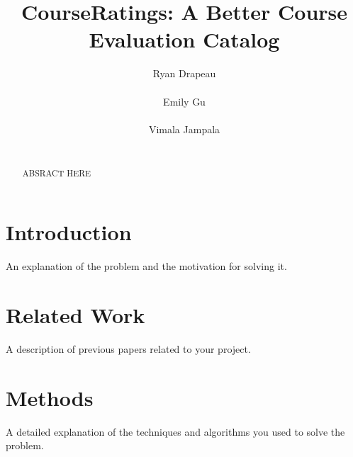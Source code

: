 \documentclass{chi2009}
\begin{document}
\setlength{\paperheight}{11in}
\setlength{\paperwidth}{8.5in}
\setlength{\pdfpageheight}{\paperheight}
\setlength{\pdfpagewidth}{\paperwidth}


\title{CourseRatings: A Better Course Evaluation Catalog}
\author{
  \alignauthor Ryan Drapeau\\
    \\
  \alignauthor Emily Gu\\
    \\
  \alignauthor Vimala Jampala\\
    \\
}

\maketitle

\begin{abstract}
    ABSRACT HERE
\end{abstract}


\section{Introduction}

An explanation of the problem and the motivation for solving it.

\section{Related Work}

A description of previous papers related to your project.

\section{Methods}

A detailed explanation of the techniques and algorithms you used to solve the problem.
\end{document}
